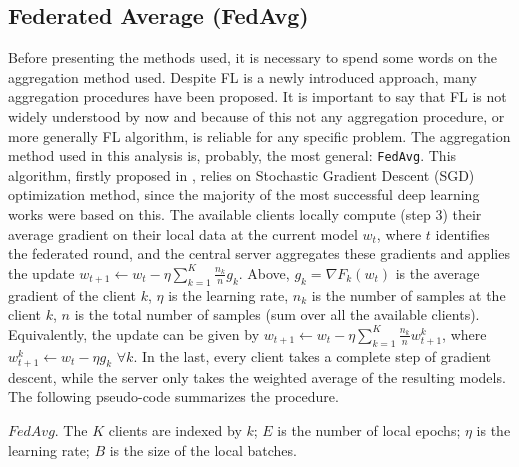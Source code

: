 \documentclass{article} %
\newcounter{math}
\begin{document}
\subsection{Federated Average (FedAvg)}
Before presenting the methods used, it is necessary to spend some words on the 
aggregation method used. Despite FL is a newly introduced approach, many 
aggregation procedures have been proposed. It is important to say that FL is 
not widely understood by now and because of this not any aggregation procedure, 
or more generally FL algorithm, is reliable for any specific problem. The 
aggregation method used in this analysis is, probably, the most general: 
\verb|FedAvg|. This algorithm, firstly proposed in \cite{mcmahan2017communicationefficient}, relies on Stochastic 
Gradient Descent (SGD) optimization method, since the majority of the most successful deep 
learning works were based on this. The available clients locally compute (step 3) their 
average gradient on their local data at the current model $w_t$, where $t$ 
identifies the federated round, and the central server aggregates these 
gradients and applies the update $w_{t+1}\leftarrow w_t - \eta\sum_{k=1}^K\frac{n_k}{n}g_k$.
Above, $g_k=\nabla F_k(w_t)$ is the average gradient of the client $k$, $\eta$ is 
the learning rate, $n_k$ is the number of samples at the client $k$, $n$ is the total 
number of samples (sum over all the available clients). Equivalently, the update 
can be given by $w_{t+1}\leftarrow w_t - \eta\sum_{k=1}^K\frac{n_k}{n}w_{t+1}^k$, where 
$w_{t+1}^k\leftarrow w_t - \eta g_k$ $\forall k$. In the last, every client takes 
a complete step of gradient descent, while the server only takes the weighted average 
of the resulting models. The following pseudo-code summarizes the procedure.
\begin{algorithm}[H]
    \SetAlgoLined

    \caption{$FedAvg$. The $K$ clients are indexed by $k$; $E$ is the number of local 
     epochs; $\eta$ is the learning rate; $B$ is the size of the local batches.}
\end{algorithm}
\end{document}
